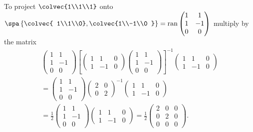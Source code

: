 \begin{example} To project $\colvec{1\\1\\1}$ onto $\spa \left\{    \colvec{ 1\\1\\0}, \colvec{1\\-1\\0 }  \right\} = \text{ran} 
\begin{pmatrix}
 1& 1  \\
1 & -1  \\
0 & 0 
\end{pmatrix}
 $ 
  multiply by the matrix 
 \begin{gather*}
\begin{pmatrix}
 1& 1  \\
1 & -1  \\
0 & 0 
\end{pmatrix}
\left [ 
 \begin{pmatrix}
 1& 1 &0 \\
1 & -1 &0 
\end{pmatrix}
\begin{pmatrix}
 1& 1  \\
1 & -1  \\
0 & 0 
\end{pmatrix}
 \right]^{-1}
 \begin{pmatrix}
 1& 1 &0 \\
1 & -1 &0 
\end{pmatrix}
 \\
=\begin{pmatrix}
 1& 1  \\
1 & -1  \\
0 & 0 
\end{pmatrix}
 \begin{pmatrix}
 2& 0  \\
0 & 2  
\end{pmatrix}^{-1}
 \begin{pmatrix}
 1& 1 &0 \\
1 & -1 &0 
\end{pmatrix} 
\\
=\frac12 \begin{pmatrix}
 1& 1  \\
1 & -1  \\
0 & 0 
\end{pmatrix}
 \begin{pmatrix}
 1& 1 &0 \\
1 & -1 &0 
\end{pmatrix} 
=
\frac12 \begin{pmatrix}
 2 & 0 &0 \\
0 & 2  &0\\
0 & 0 &0
\end{pmatrix}. 
\end{gather*}


\end{example}
